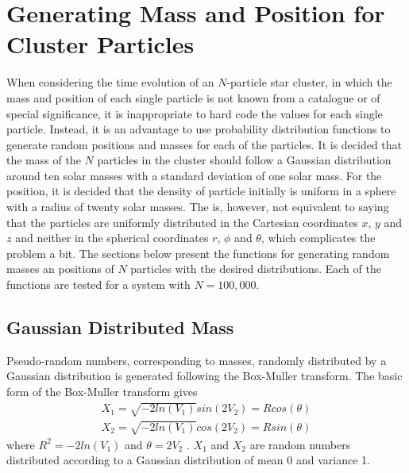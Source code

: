 \section{Generating Mass and Position for Cluster Particles}
\label{Method:GeneratingPosMassVel}
When considering the time evolution of an $N$-particle star cluster, in which the mass and position of each single particle is not known from a catalogue or of special significance, it is inappropriate to hard code the values for each single particle. 
Instead, it is an advantage to use probability distribution functions to generate random positions and masses for each of the particles. 
It is decided that the mass of the $N$ particles in the cluster should follow a Gaussian distribution around ten solar masses with a standard deviation of one solar mass.
For the position, it is decided that the density of particle initially is uniform in a sphere with a radius of twenty solar masses.
The is, however, not equivalent to saying that the particles are uniformly distributed in the Cartesian coordinates $x$, $y$ and $z$ and neither in the spherical coordinates $r$, $\phi$ and $\theta$, which complicates the problem a bit.
The sections below present the functions for generating random masses an positions of $N$ particles with the desired distributions. 
Each of the functions are tested for a system with $N=100,000$.

\subsection{Gaussian Distributed Mass}
Pseudo-random numbers, corresponding to masses, randomly distributed by a Gaussian distribution is generated following the Box-Muller transform. 
The basic form of the Box-Muller transform gives
\begin{align*}
	X_1 = \sqrt{-2ln(V_1)}sin(2V_2)=Rcos(\theta)
	\\
	X_2 = \sqrt{-2ln(V_1)}cos(2V_2)=Rsin(\theta)
\end{align*}
where $R ^2 = -2ln(V_1)$ and $\theta =2V_2$ \cite{BMWidentity}.
$X_1$ and $X_2$ are random numbers distributed according to a Gaussian distribution of mean 0 and variance 1.

